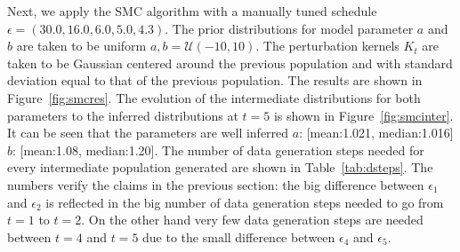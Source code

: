 \documentclass[12pt,a4paper,titlepage]{article}
\begin{document}
Next, we apply the SMC algorithm with a manually tuned schedule $\epsilon = (30.0, 16.0, 6.0, \allowbreak5.0, 4.3)$. The prior distributions for model parameter $a$ and $b$ are taken to be uniform $a, b = \mathcal{U}(-10, 10)$. The perturbation kernels $K_{t}$ are taken to be Gaussian centered around the previous population and with standard deviation equal to that of the previous population. The results are shown in Figure~\ref{fig:smcres}. The evolution of the intermediate distributions for both parameters to the inferred distributions at $t=5$ is shown in Figure~\ref{fig:smcinter}. It can be seen that the parameters are well inferred $a$: [mean:1.021, median:1.016] $b$: [mean:1.08, median:1.20]. The number of data generation steps needed for every intermediate population generated are shown in Table~\ref{tab:dsteps}. The numbers verify the claims in the previous section: the big difference between $\epsilon_{1}$ and $\epsilon_{2}$ is reflected in the big number of data generation steps needed to go from $t=1$ to $t=2$. On the other hand very few data generation steps are needed between $t=4$ and $t=5$ due to the small difference between $\epsilon_{4}$ and $\epsilon_{5}$.
\end{document}
